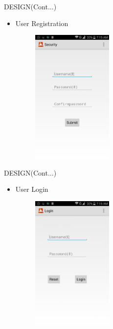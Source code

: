  \begin{frame}{DESIGN(Cont...)}  
   \begin{itemize}
  	\item User Registration 
 	 \begin{figure}[ht!]
     \centering
    \includegraphics[width=4cm]{reg.png}
    \label{fig:pc control window}
\end{figure}
   \end{itemize}
 \end{frame} 
 
 \begin{frame}{DESIGN(Cont...)}  
   \begin{itemize}
  	\item User Login 
 	 \begin{figure}[ht!]
     \centering
    \includegraphics[width=4cm]{login.png}
    \label{fig:pc control system}
\end{figure}
   \end{itemize}
 \end{frame} 
 
